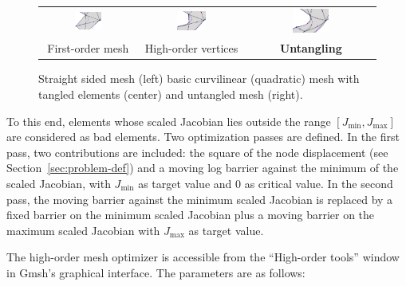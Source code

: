 \documentclass[12pt,a4paper,a4wide]{article}
\begin{document}
\begin{figure}
  \begin{center}
  \begin{tabular}{ccc}
  \includegraphics[width=0.3\textwidth]{untangling/linear} &
  \includegraphics[width=0.3\textwidth]{untangling/p2_bad} &
  \includegraphics[width=0.3\textwidth]{untangling/p2}\\
  First-order mesh & High-order vertices &\textbf{Untangling}
  \end{tabular}
\end{center}
\caption{Straight sided mesh (left) basic curvilinear (quadratic)
mesh with tangled elements (center) and untangled mesh (right).
\label{fig:untangling}}
\end{figure}

To this end, elements whose scaled Jacobian lies outside the
range $[J_{\min}, J_{\max}]$ are considered as bad elements. Two
optimization passes are defined. In the first pass, two
contributions are included: the square of the node displacement
(see Section~\ref{sec:problem-def}) and a moving log barrier against
the minimum of the scaled Jacobian, with $J_{\min}$ as target value
and $0$ as critical value. In the second pass, the moving barrier
against the minimum scaled Jacobian is replaced by a fixed barrier
on the minimum scaled Jacobian plus a moving barrier on the maximum
scaled Jacobian with $J_{\max}$ as target value.


The high-order mesh optimizer is accessible from the ``High-order
tools'' window in Gmsh's graphical interface. The parameters are
as follows:
\end{document}
